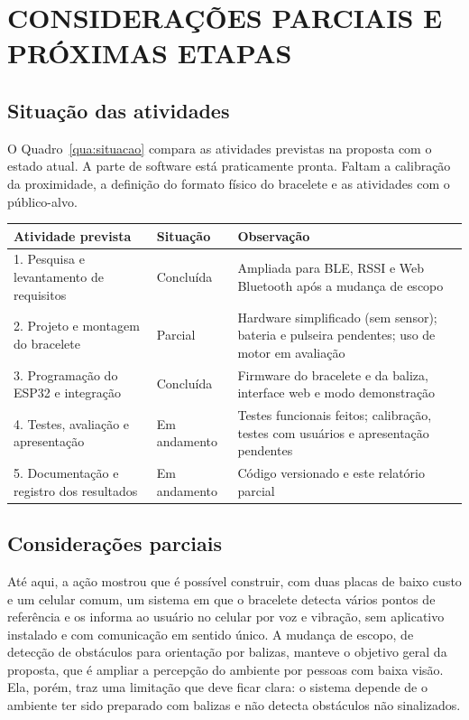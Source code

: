 \chapter{CONSIDERAÇÕES PARCIAIS E PRÓXIMAS ETAPAS}
\label{cap:consideracoes}

\section{Situação das atividades}
\label{sec:situacao}

O Quadro~\ref{qua:situacao} compara as atividades previstas na proposta com o estado atual. A parte de software está praticamente pronta. Faltam a calibração da proximidade, a definição do formato físico do bracelete e as atividades com o público-alvo.

\begin{quadro}[htb]
\caption{Situação das atividades previstas na proposta}
\label{qua:situacao}
\small
\begin{tabular}{|p{5.4cm}|p{2.4cm}|p{6.2cm}|}
\hline
\textbf{Atividade prevista} & \textbf{Situação} & \textbf{Observação} \\
\hline
1. Pesquisa e levantamento de requisitos & Concluída & Ampliada para BLE, RSSI e Web Bluetooth após a mudança de escopo \\
\hline
2. Projeto e montagem do bracelete & Parcial & Hardware simplificado (sem sensor); bateria e pulseira pendentes; uso de motor em avaliação \\
\hline
3. Programação do ESP32 e integração & Concluída & Firmware do bracelete e da baliza, interface web e modo demonstração \\
\hline
4. Testes, avaliação e apresentação & Em andamento & Testes funcionais feitos; calibração, testes com usuários e apresentação pendentes \\
\hline
5. Documentação e registro dos resultados & Em andamento & Código versionado e este relatório parcial \\
\hline
\end{tabular}
\normalsize
{}
\end{quadro}

\section{Considerações parciais}
\label{sec:consideracoes-parciais}

Até aqui, a ação mostrou que é possível construir, com duas placas de baixo custo e um celular comum, um sistema em que o bracelete detecta vários pontos de referência e os informa ao usuário no celular por voz e vibração, sem aplicativo instalado e com comunicação em sentido único. A mudança de escopo, de detecção de obstáculos para orientação por balizas, manteve o objetivo geral da proposta, que é ampliar a percepção do ambiente por pessoas com baixa visão. Ela, porém, traz uma limitação que deve ficar clara: o sistema depende de o ambiente ter sido preparado com balizas e não detecta obstáculos não sinalizados.

